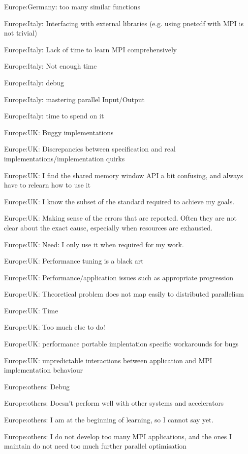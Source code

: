 \item Europe:Germany: too many similar functions
\item Europe:Italy: Interfacing with external libraries (e.g. using pnetcdf with MPI is not trivial)
\item Europe:Italy: Lack of time to learn MPI comprehensively
\item Europe:Italy: Not enough time
\item Europe:Italy: debug
\item Europe:Italy: mastering parallel Input/Output
\item Europe:Italy: time to spend on it
\item Europe:UK: Buggy implementations
\item Europe:UK: Discrepancies between specification and real implementations/implementation quirks
\item Europe:UK: I find the shared memory window API a bit confusing, and always have to relearn how to use it
\item Europe:UK: I know the subset of the standard required to achieve my goals.
\item Europe:UK: Making sense of the errors that are reported. Often they are not clear about the exact cause, especially when resources are exhausted.
\item Europe:UK: Need: I only use it when required for my work.
\item Europe:UK: Performance tuning is a black art
\item Europe:UK: Performance/application issues such as appropriate progression
\item Europe:UK: Theoretical problem does not map easily to distributed parallelism
\item Europe:UK: Time
\item Europe:UK: Too much else to do!
\item Europe:UK: performance portable  implentation specific workarounds for bugs
\item Europe:UK: unpredictable interactions between application and MPI implementation behaviour
\item Europe:others: Debug
\item Europe:others: Doesn't perform well with other systems and accelerators
\item Europe:others: I am at the beginning of learning, so I cannot say yet.
\item Europe:others: I do not develop too many MPI applications, and the ones I maintain do not need too much further parallel optimisation
